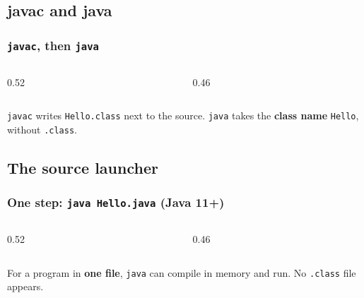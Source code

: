 \documentclass[aspectratio=169,10pt,compress]{beamer}
\begin{document}

\subsection[Hello]{javac and java}




\begin{frame}[t,fragile] \frametitle{\texttt{javac}, then \texttt{java}}
  \begin{columns}[T]
    \begin{column}{0.52\textwidth}
    \end{column}
    \begin{column}{0.46\textwidth}
    \end{column}
  \end{columns}

  \vspace{0.2em}
  \small \texttt{javac} writes \texttt{Hello.class} next to the source. \texttt{java} takes the \textbf{class name}
  \texttt{Hello}, without \texttt{.class}.
\end{frame}

\subsection[Launcher]{The source launcher}




\begin{frame}[t,fragile] \frametitle{One step: \texttt{java Hello.java} (Java 11+)}
  \begin{columns}[T]
    \begin{column}{0.52\textwidth}
    \end{column}
    \begin{column}{0.46\textwidth}
    \end{column}
  \end{columns}

  \vspace{0.2em}
  \small For a program in \textbf{one file}, \texttt{java} can compile in memory and run. No \texttt{.class} file appears.
\end{frame}
\end{document}

